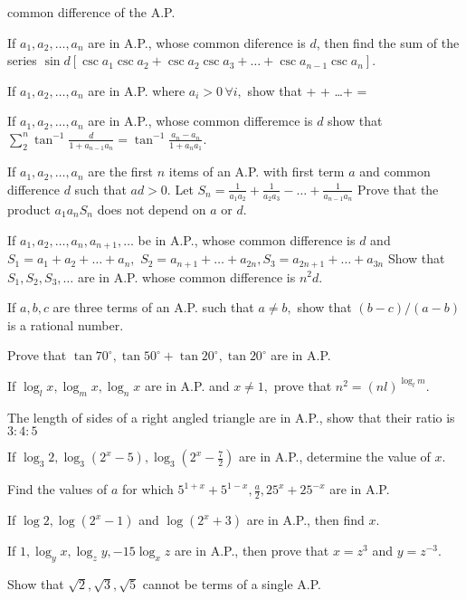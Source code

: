   common difference of the A.P.
\item If $a_1, a_2, \ldots, a_n$ are in A.P., whose common diference is $d$, then find the sum of the series $\sin
  d[\csc a_1\csc a_2 + \csc a_2\csc a_3 + \ldots + \csc a_{n - 1}\csc a_n]$.
\item If $a_1, a_2, \ldots, a_n$ are in A.P. where $a_i > 0\,\forall i,$ show that \startformula {} +
   + \ldots +  = \stopformula
\item If $a_1, a_2, \ldots, a_n$ are in A.P., whose common differemce is $d$ show that $\displaystyle\sum_{2}^n\tan^{-1}\frac{d}{1 +
  a_{n - 1}a_n} = \tan^{-1}\frac{a_n - a_n}{1 + a_na_1}$.
\item If $a_1, a_2, \ldots, a_n$ are the first $n$ items of an A.P. with first term $a$ and common difference $d$ such
  that $ad > 0.$ Let $S_n = \frac{1}{a_1a_2} + \frac{1}{a_2a_3} - \ldots + \frac{1}{a_{n - 1}a_n}$ Prove that the product
  $a_1a_nS_n$ does not depend on $a$ or $d$.
\item If $a_1, a_2, \ldots, a_n, a_{n + 1}, \ldots$ be in A.P., whose common difference is $d$ and $S_1 = a_1 + a_2 +
  \ldots + a_n,$ $S_2 = a_{n + 1} + \ldots + a_{2n}, S_3 = a_{2n + 1} + \ldots + a_{3n}$ Show that $S_1, S_2, S_3, \ldots$ are in
  A.P. whose common difference is $n^2d$.
\item If $a, b, c$ are three terms of an A.P. such that $a\neq b,$ show that $(b - c)/(a - b)$ is a rational number.
\item Prove that $\tan 70^\circ, \tan 50^\circ + \tan 20^\circ, \tan 20^\circ$ are in A.P.
\item If $\log_l x, \log_m x, \log_n x$ are in A.P. and $x \neq 1,$ prove that $n^2 = (nl)^{\log_l m}$.
\item The length of sides of a right angled triangle are in A.P., show that their ratio is $3:4:5$
\item If $\log_3 2, \log_3(2^x - 5), \log_3\left(2^x - \frac{7}{2}\right)$ are in A.P., determine the value of $x$.
\item Find the values of $a$ for which $5^{1 + x} + 5^{1 - x}, \frac{a}{2}, 25^x + 25^{-x}$ are in A.P.
\item If $\log 2, \log(2^x - 1)$ and $\log(2^x + 3)$ are in A.P., then find $x$.
\item If $1, \log_y x, \log_zy, -15\log_xz$ are in A.P., then prove that $x = z^3$ and $y = z^{-3}$.
\item Show that $\sqrt{2}, \sqrt{3}, \sqrt{5}$ cannot be terms of a single A.P.
